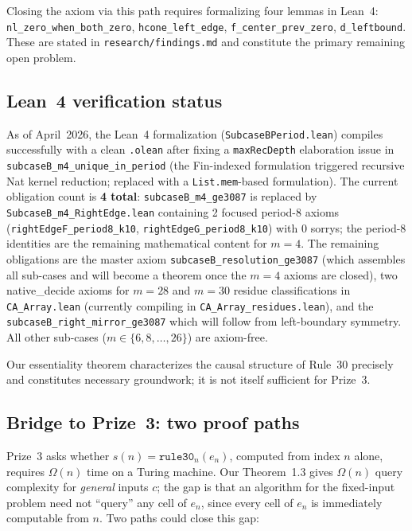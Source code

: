 \documentclass[11pt]{article}
\theoremstyle{plain}
\theoremstyle{definition}
\begin{document}
Closing the axiom via this path requires formalizing four lemmas
in Lean~4: \texttt{nl\_zero\_when\_both\_zero},
\texttt{hcone\_left\_edge}, \texttt{f\_center\_prev\_zero}, \texttt{d\_leftbound}.
These are stated in \texttt{research/findings.md} and constitute the primary
remaining open problem.

\subsection*{Lean~4 verification status}
As of April~2026, the Lean~4 formalization (\texttt{SubcaseBPeriod.lean}) compiles
successfully with a clean \texttt{.olean} after fixing a \texttt{maxRecDepth}
elaboration issue in \texttt{subcaseB\_m4\_unique\_in\_period} (the Fin-indexed
formulation triggered recursive Nat kernel reduction; replaced with a
\texttt{List.mem}-based formulation).  The current obligation count is
\textbf{4 total}: \texttt{subcaseB\_m4\_ge3087} is replaced by
\texttt{SubcaseB\_m4\_RightEdge.lean} containing 2 focused period-8 axioms
(\texttt{rightEdgeF\_period8\_k10}, \texttt{rightEdgeG\_period8\_k10}) with 0 sorrys;
the period-8 identities are the remaining mathematical content for $m=4$.
The remaining obligations are the master axiom
\texttt{subcaseB\_resolution\_ge3087} (which assembles all sub-cases and will become a
theorem once the $m=4$ axioms are closed), two native\_decide axioms for $m=28$ and
$m=30$ residue classifications in \texttt{CA\_Array.lean} (currently compiling in
\texttt{CA\_Array\_residues.lean}), and the \texttt{subcaseB\_right\_mirror\_ge3087}
which will follow from left-boundary symmetry.
All other sub-cases ($m \in \{6, 8, \ldots, 26\}$) are axiom-free.

Our essentiality theorem characterizes the causal structure of Rule~30 precisely and
constitutes necessary groundwork; it is not itself sufficient for Prize~3.

\subsection*{Bridge to Prize~3: two proof paths}

Prize~3 asks whether $s(n) = \mathtt{rule30}_n(e_n)$, computed from index $n$ alone,
requires $\Omega(n)$ time on a Turing machine.  Our Theorem~1.3 gives $\Omega(n)$
query complexity for \emph{general} inputs $c$; the gap is that an algorithm for the
fixed-input problem need not ``query'' any cell of $e_n$, since every cell of $e_n$ is
immediately computable from $n$.  Two paths could close this gap:
\end{document}
